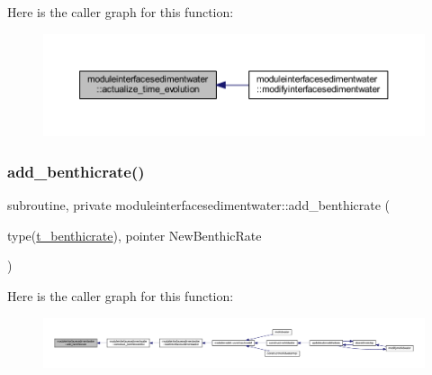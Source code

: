 Here is the caller graph for this function\+:\nopagebreak
\begin{figure}[H]
\begin{center}
\leavevmode
\includegraphics[width=350pt]{namespacemoduleinterfacesedimentwater_a82f97321667d905db79c85b574f47802_icgraph}
\end{center}
\end{figure}
\mbox{\label{namespacemoduleinterfacesedimentwater_a9d88824cf037c2b56b53fc58c3274259}} 
\subsubsection{\texorpdfstring{add\+\_\+benthicrate()}{add\_benthicrate()}}
{\footnotesize\ttfamily subroutine, private moduleinterfacesedimentwater\+::add\+\_\+benthicrate (\begin{DoxyParamCaption}\item[{type(\mbox{\hyperlink{structmoduleinterfacesedimentwater_1_1t__benthicrate}{t\+\_\+benthicrate}}), pointer}]{New\+Benthic\+Rate }\end{DoxyParamCaption})\hspace{0.3cm}{\ttfamily [private]}}

Here is the caller graph for this function\+:\nopagebreak
\begin{figure}[H]
\begin{center}
\leavevmode
\includegraphics[width=350pt]{namespacemoduleinterfacesedimentwater_a9d88824cf037c2b56b53fc58c3274259_icgraph}
\end{center}
\end{figure}
\mbox{\label{namespacemoduleinterfacesedimentwater_aa06e726d01ab265942552440a00f80f8}} 
